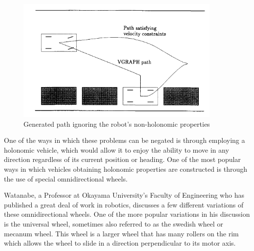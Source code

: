 			\begin{figure}[h]
				\centering
				\includegraphics[scale=0.9]{ANALYSIS/generatedpathfailure.png}
				\caption{Generated path ignoring the robot's non-holonomic properties}
				\label{fig:generatedpathfailure}
			\end{figure}
			
			One of the ways in which these problems can be negated is through employing a holonomic vehicle, which would allow it to enjoy the ability to move in any direction regardless of its current position or heading. One of the most popular ways in which vehicles obtaining holonomic properties are constructed is through the use of special omnidirectional wheels.
				
			Watanabe\citep{watanabe1998control}, a Professor at Okayama University's Faculty of Engineering who has published a great deal of work in robotics, discusses a few different variations of these omnidirectional wheels. One of the more popular variations in his discussion is the universal wheel, sometimes also referred to as the swedish wheel or mecanum wheel. This wheel is a larger wheel that has many rollers on the rim which allows the wheel to slide in a direction perpendicular to its motor axis. 
				
